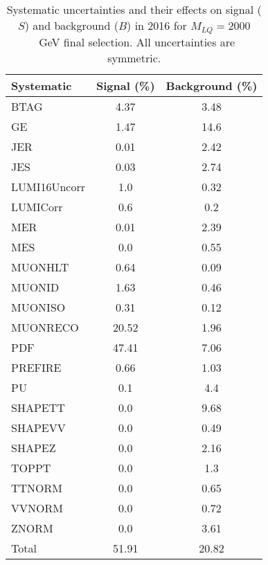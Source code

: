 \begin{table}[htbp]
\begin{center}
\caption{Systematic uncertainties and their effects on signal ($S$) and background ($B$) in 2016 for $M_{LQ}=2000$~GeV final selection. All uncertainties are symmetric.}
\begin{tabular}{lcc}
\hline\hline
Systematic & Signal (\%) & Background (\%) \\ \hline 
BTAG & 4.37 & 3.48\\ 
GE & 1.47 & 14.6\\ 
JER & 0.01 & 2.42\\ 
JES & 0.03 & 2.74\\ 
LUMI16Uncorr & 1.0 & 0.32\\ 
LUMICorr & 0.6 & 0.2\\ 
MER & 0.01 & 2.39\\ 
MES & 0.0 & 0.55\\ 
MUONHLT & 0.64 & 0.09\\ 
MUONID & 1.63 & 0.46\\ 
MUONISO & 0.31 & 0.12\\ 
MUONRECO & 20.52 & 1.96\\ 
PDF & 47.41 & 7.06\\ 
PREFIRE & 0.66 & 1.03\\ 
PU & 0.1 & 4.4\\ 
SHAPETT & 0.0 & 9.68\\ 
SHAPEVV & 0.0 & 0.49\\ 
SHAPEZ & 0.0 & 2.16\\ 
TOPPT & 0.0 & 1.3\\ 
TTNORM & 0.0 & 0.65\\ 
VVNORM & 0.0 & 0.72\\ 
ZNORM & 0.0 & 3.61\\ 
Total & 51.91 & 20.82\\ \hline \hline
\end{tabular}
\label{tab:SysUncertainties_uujj_2000}
\end{center}
\end{table}

